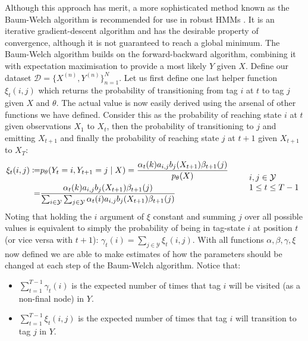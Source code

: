 \documentclass[../main.tex]{subfiles}
\begin{document}
Although this approach has merit, a more sophisticated method known as the Baum-Welch algorithm \autocite{baum-1972-alg} is recommended for use in robust HMMs \autocite{kupiec-1992-hmm}.
It is an iterative gradient-descent algorithm and has the desirable property of convergence, although it is not guaranteed to reach a global minimum.
The Baum-Welch algorithm builds on the forward-backward algorithm, combining it with expectation maximisation to provide a most likely $Y$ given $X$.
Define our dataset $\mathcal{D} = \{X^{(n)}, Y^{(n)}\}_{n=1}^N$.
Let us first define one last helper function $\xi_t(i,j)$ which returns the probability of transitioning from tag $i$ at $t$ to tag $j$ given $X$ and $\theta$. The actual value is now easily derived using the arsenal of other functions we have defined. Consider this as the probability of reaching state $i$ at $t$ given observations $X_1$ to $X_t$, then the probability of transitioning to $j$ and emitting $X_{t+1}$ and finally the probability of reaching state $j$ at $t+1$ given $X_{t+1}$ to $X_T$:
\begin{equation*}
\begin{aligned}
    \xi_t(i,j) \coloneqq & p_\theta(Y_t = i, Y_{t+1} = j \mid X) = \frac{\alpha_t(k)a_{i,j}b_j(X_{t+1})\beta_{t+1}(j)}{p_\theta(X)} \\
    =& \frac{\alpha_t(k)a_{i,j}b_j(X_{t+1})\beta_{t+1}(j)}{\sum_{i \in \mathcal{Y}} \sum_{j \in \mathcal{Y}} \alpha_t(i)a_{i,j}b_j(X_{t+1})\beta_{t+1}(j)}
    \end{aligned} \qquad \begin{array}{lr}
            i,j \in \mathcal{Y} \\
            1 \leq t \leq T-1
        \end{array}
\end{equation*}
Noting that holding the $i$ argument of $\xi$ constant and summing $j$ over all possible values is equivalent to simply the probability of being in tag-state $i$ at position $t$ (or vice versa with $t+1$): $\gamma_t(i) = \sum_{j \in \mathcal{Y}} \xi_t(i,j)$.
With all functions $\alpha, \beta, \gamma, \xi$ now defined we are able to make estimates of how the parameters should be changed at each step of the Baum-Welch algorithm.
Notice that:
\begin{itemize}
    \item $\sum_{t=1}^{T-1} \gamma_t(i)$ is the expected number of times that tag $i$ will be visited (as a non-final node) in $Y$.
    \item $\sum_{t=1}^{T-1} \xi_t(i, j)$ is the expected number of times that tag $i$ will transition to tag $j$ in $Y$.
\end{itemize}
\end{document}
